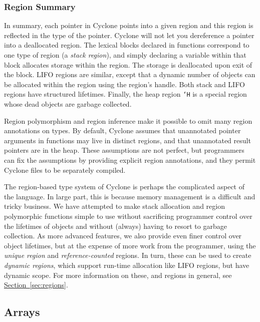 \subsubsection*{Region Summary}

In summary, each pointer in Cyclone points into a given region
and this region is reflected in the type of the pointer.  Cyclone
will not let you dereference a pointer into a deallocated region.
The lexical blocks declared in functions correspond to one
type of region (a \emph{stack region}), and simply declaring a variable within that
block allocates storage within the region.  The storage is
deallocated upon exit of the block.  LIFO regions are
similar, except that a dynamic number of objects can be allocated
within the region using the region's handle.  Both stack
and LIFO regions have structured lifetimes.  %
Finally, the heap region \texttt{`H} is a
special region whose dead objects are garbage collected.  

Region polymorphism and region inference make it possible to omit many
region annotations on types.  By default, Cyclone assumes that
unannotated pointer arguments in
functions may live in distinct regions, and that unannotated result
pointers are in the heap.  These assumptions are not perfect, but 
programmers can fix the assumptions by providing explicit region
annotations, and they permit Cyclone files to be separately compiled.

The region-based type system of Cyclone is perhaps the
complicated aspect of the language.  In large part, this is
because memory management is a difficult and tricky business.
We have attempted to make stack allocation and region polymorphic
functions simple to use without sacrificing programmer control
over the lifetimes of objects and without (always) having to resort to
garbage collection.  As more advanced features, we also provide
even finer control over object lifetimes, but at the expense of
more work from the programmer, using the \emph{unique region} and
\emph{reference-counted} regions.  In turn, these can be used to
create \emph{dynamic regions}, which support run-time allocation like
LIFO regions, but have dynamic scope.  For more information on these,
and regions in general, see
\hyperref[{sec:regions}]{Section~\ref{sec:regions}}.

\subsection{Arrays}

